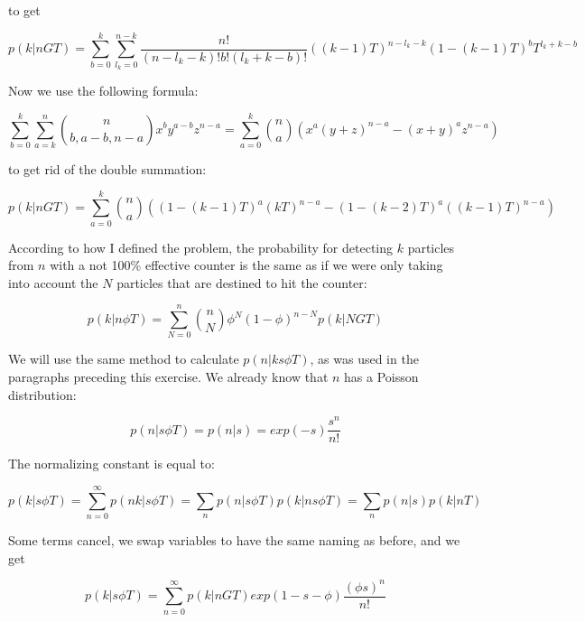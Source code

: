 \documentclass{note}
\begin{document}
\begin{solution}
to get

\begin{equation*}
p(k | n G T) = \sum_{b=0}^{k} \sum_{l_k=0}^{n-k} \frac{n!}{(n-l_k-k)!b!(l_k+k-b)!} ((k-1)T)^{n-l_k-k} (1-(k-1)T)^b T^{l_k+k-b}
\end{equation*}

Now we use the following formula:

\begin{equation*}
\sum_{b=0}^{k} \sum_{a=k}^{n} \binom{n}{b, a-b, n-a} x^b y^{a-b} z^{n-a} = \sum_{a=0}^{k} \binom{n}{a} \left(x^a(y+z)^{n-a} - (x + y)^a z^{n-a}\right)
\end{equation*}

to get rid of the double summation:

\begin{equation*}
p(k | n G T) = \sum_{a=0}^{k} \binom{n}{a} \left((1 - (k-1)T)^a(kT)^{n-a} - (1-(k-2)T)^a((k-1)T)^{n-a}\right)
\end{equation*}

According to how I defined the problem, the probability for detecting $k$ particles from $n$ with a not 100\% effective counter is the same as if we were only taking into account the $N$ particles that are destined to hit the counter:

\begin{equation*}
p(k | n \phi T) = \sum_{N=0}^{n} \binom{n}{N} \phi^N (1-\phi)^ {n - N} p(k | N G T)
\end{equation*}

We will use the same method to calculate $p(n | k s \phi T)$, as was used in the paragraphs preceding this exercise. We already know that $n$ has a Poisson distribution:

\begin{equation*}
p(n|s \phi T) = p(n|s) = exp(-s)\frac{s^n}{n!}
\end{equation*}

The normalizing constant is equal to:

\begin{equation*}
p(k | s \phi T) = \sum_{n=0}^{\infty} p(nk | s \phi T) = \sum_{n} p(n | s \phi T) p(k | n s \phi T) = \sum_{n} p(n | s) p(k | n T)
\end{equation*}

Some terms cancel, we swap variables to have the same naming as before, and we get

\begin{equation*}
p(k | s \phi T) = \sum_{n=0}^{\infty} p(k|nGT) exp(1 - s - \phi) \frac{(\phi s)^n}{n!}
\end{equation*}


\end{solution}
\end{document}
